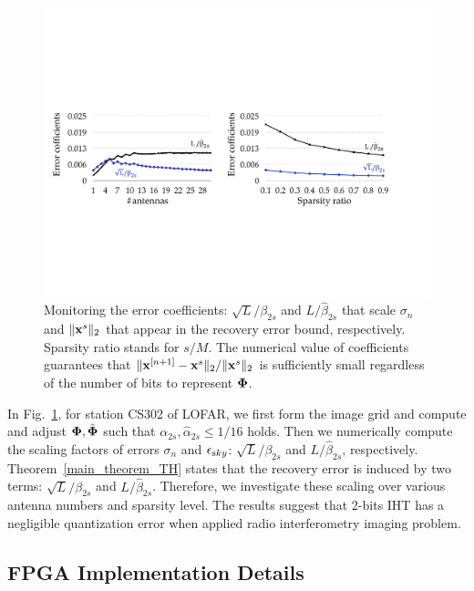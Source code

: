 \documentclass{article}
\begin{document}
 
 
\begin{figure}[t!]
\centering
\includegraphics[width=0.88\columnwidth, angle=0]{figs/beta_k.pdf}
\caption{Monitoring the error coefficients: $\sqrt{L}/\beta_{2s}$ and $L/\hat{\beta}_{2s}$ that scale $ \sigma_n$ and $\|{\bf x}^s \|_2$ that appear in the recovery error bound, respectively. Sparsity ratio stands for $s/M$. The numerical value of coefficients guarantees that $\|{\bf x}^{[n+1]}-{\bf x}^s\|_2/\|{\bf x}^s \|_2$ is sufficiently small regardless of the number of bits to represent ${\bf \Phi}$.}
\label{fig:beta}
\end{figure}

In Fig.~\ref{fig:beta}, for station CS302 of LOFAR, we first form the image grid and compute and adjust ${\bf \Phi}, \hat{\bf \Phi}$ such that $\alpha_{2s}, \hat{\alpha}_{2s}\leq 1/16$ holds. Then we numerically compute the scaling factors of errors $\sigma_n$ and ${\epsilon}_{\textrm sky}$: $\sqrt{L}/\beta_{2s}$ and ${L}/{\hat{\beta}_{2s}}$, respectively. Theorem~\ref{main_theorem_TH} states that the recovery error is induced by two terms: $\sqrt{L}/\beta_{2s}$ and $L/\hat{\beta}_{2s}$. Therefore, we investigate these scaling over various antenna numbers and sparsity level. The results suggest that 2-bits IHT has a negligible quantization error when applied radio interferometry imaging problem.

\subsection{FPGA Implementation Details} \label{sec:fpga}
\end{document}

